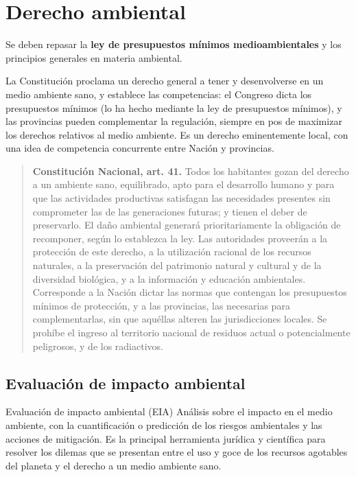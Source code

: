 \documentclass[12pt,oneside]{book}
\begin{document}
\section{Derecho ambiental}

Se deben repasar la \textbf{ley de presupuestos mínimos medioambientales} y los principios generales en materia ambiental.

La Constitución proclama un derecho general a tener y desenvolverse en un medio ambiente sano, y establece las competencias: el Congreso dicta los presupuestos mínimos (lo ha hecho mediante la ley de presupuestos mínimos), y las provincias pueden complementar la regulación, siempre en pos de maximizar los derechos relativos al medio ambiente. Es un derecho eminentemente local, con una idea de competencia concurrente entre Nación y provincias.

\begin{quote}
\textbf{Constitución Nacional, art. 41.} Todos los habitantes gozan del derecho a un ambiente sano, equilibrado, apto para el desarrollo humano y para que las actividades productivas satisfagan las necesidades presentes sin comprometer las de las generaciones futuras; y tienen el deber de preservarlo. El daño ambiental generará prioritariamente la obligación de recomponer, según lo establezca la ley. Las autoridades proveerán a la protección de este derecho, a la utilización racional de los recursos naturales, a la preservación del patrimonio natural y cultural y de la diversidad biológica, y a la información y educación ambientales. Corresponde a la Nación dictar las normas que contengan los presupuestos mínimos de protección, y a las provincias, las necesarias para complementarlas, sin que aquéllas alteren las jurisdicciones locales. Se prohíbe el ingreso al territorio nacional de residuos actual o potencialmente peligrosos, y de los radiactivos.
\end{quote}

\subsection{Evaluación de impacto ambiental}

\begin{definition}{Evaluación de impacto ambiental (EIA)}
Análisis sobre el impacto en el medio ambiente, con la cuantificación o predicción de los riesgos ambientales y las acciones de mitigación. Es la principal herramienta jurídica y científica para resolver los dilemas que se presentan entre el uso y goce de los recursos agotables del planeta y el derecho a un medio ambiente sano.
\end{definition}
\end{document}

